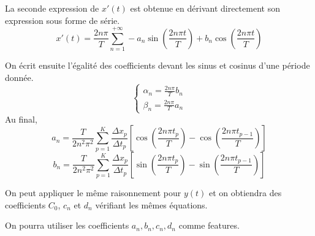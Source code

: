 La seconde expression de $x'(t)$ est obtenue en dérivant directement son 
expression sous forme de série.
\[
x'(t) = \frac{2n\pi}{T}\sum_{n = 1}^{+\infty} -a_n \sin\left(\frac{2n\pi t}{T}\right) 
  + b_n \cos\left(\frac{2n\pi t}{T}\right) 
\]

On écrit ensuite l'égalité des coefficients devant les sinus et cosinus 
d'une période donnée.
\[
\begin{cases}
  \alpha_n = \frac{2n\pi}{T} b_n \\
  \beta_n = \frac{2n\pi}{T} a_n
\end{cases}
\]
Au final, 
\[
a_n = \frac{T}{2 n^2 \pi^2} \sum_{p = 1}^{K} \frac{\Delta x_p}{\Delta t_p} \left[ \cos\left(\frac{2n\pi t_p}{T}\right) - \cos\left(\frac{2n\pi t_{p-1}}{T}\right) \right]
\]
\[
b_n = \frac{T}{2 n^2 \pi^2} \sum_{p = 1}^{K} \frac{\Delta x_p}{\Delta t_p} \left[ \sin\left(\frac{2n\pi t_p}{T}\right) - \sin\left(\frac{2n\pi t_{p-1}}{T}\right) \right]
\]

On peut appliquer le même raisonnement pour $y(t)$ et on obtiendra des 
coefficients $C_0$, $c_n$ et $d_n$ vérifiant les mêmes équations.

On pourra utiliser les coefficients $a_n, b_n, c_n, d_n$ comme features.

